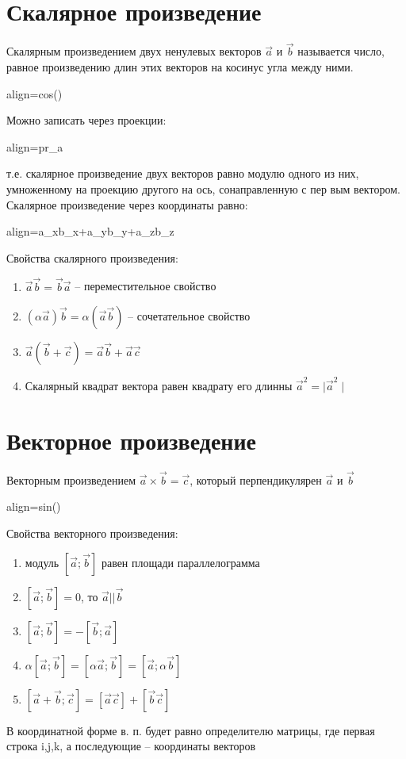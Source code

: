 \documentclass[oneside]{book}
\newcommand{\boxedeq}[2]{\begin{empheq}[box={\fboxsep=6pt\fbox}]{align}\label{#1}#2\end{empheq}}
\begin{document}
\begin{enumerate}
\begin{itemize}
\begin{enumerate}
\section{Скалярное произведение}
Скалярным произведением двух ненулевых векторов $\vec{a}$ и $\vec{b}$ называется число, равное произведению длин этих векторов на ко­синус угла между ними.
\boxedeq{eq:*}{\cdot{}=\mid\vec{a}\mid\cdot\mid\vec{b}\mid cos(\phi)}
Можно записать через проекции:
\boxedeq{eq:*}{\cdot{}=\mid\vec{a}\mid\cdot pr_{a} \vec{b}}
т.е. скалярное произведение двух векторов равно модулю одного
из
них, умноженному на проекцию другого на ось, сонаправленную с пер­
вым вектором.
Скалярное произведение через координаты равно:
\boxedeq{eq:*}{\cdot{}=a_{x}b_{x}+a_{y}b_{y}+a_{z}b_{z}}
Свойства скалярного произведения:
\begin{enumerate}
  \item $\vec{a}\vec{b}=\vec{b}\vec{a}$ -- переместительное свойство
  \item $(\alpha\vec{a})\vec{b}=\alpha(\vec{a}\vec{b})$ -- сочетательное свойство
  \item $\vec{a}(\vec{b}+\vec{c})=\vec{a}\vec{b}+\vec{a}\vec{c}$
  \item Скалярный квадрат вектора равен квадрату его длинны $\vec{a}^{2}=\mid\vec{a}^{2}\mid$
\end{enumerate}

\section{Векторное произведение}
Векторным произведением $\vec{a}\times\vec{b}=\vec{c}$, который перпендикулярен  $$ и $$
\boxedeq{eq:*}{=\mid\vec{a}\vec{b}\mid sin(\phi)}

Свойства векторного произведения:
\begin{enumerate}
  \item модуль $[\vec{a};\vec{b}]$ равен площади параллелограмма 
  \item $[\vec{a};\vec{b}]=0$, то $\vec{a}||\vec{b}$ 
  \item $[\vec{a};\vec{b}]=-[\vec{b};\vec{a}]$
  \item  $\alpha[\vec{a};\vec{b}]=[\alpha\vec{a};\vec{b}]=[\vec{a};\alpha\vec{b}]$
  \item $[\vec{a}+\vec{b};\vec{c}]=[\vec{a}\vec{c}]+[\vec{b}\vec{c}]$
\end{enumerate}
В координатной форме в. п. будет равно определителю матрицы, где первая строка i,j,k, а последующие -- координаты векторов

\end{enumerate}
\end{itemize}
\end{enumerate}
\end{document}
